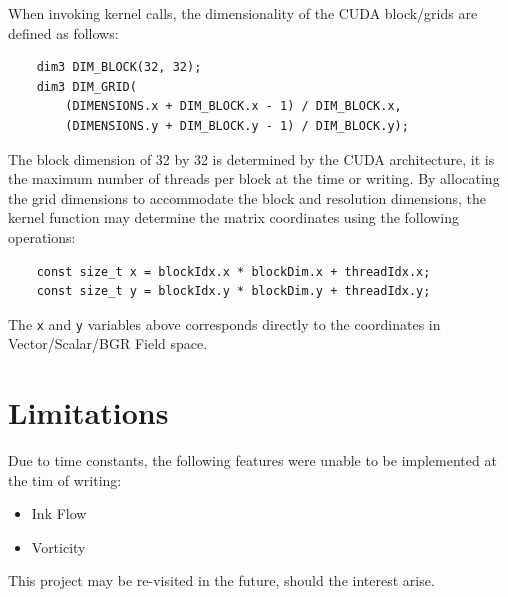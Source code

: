 \documentclass[
10pt, %
letterpaper, %
oneside, %
headinclude,footinclude, %
BCOR5mm, %
]{scrartcl}
\begin{document}
When invoking kernel calls, the dimensionality of the CUDA block/grids are defined as follows:
\begin{verbatim}
    dim3 DIM_BLOCK(32, 32);
    dim3 DIM_GRID(
        (DIMENSIONS.x + DIM_BLOCK.x - 1) / DIM_BLOCK.x,
        (DIMENSIONS.y + DIM_BLOCK.y - 1) / DIM_BLOCK.y);
\end{verbatim}

The block dimension of 32 by 32 is determined by the CUDA architecture, it is the maximum number of threads per block at the time or writing.
By allocating the grid dimensions to accommodate the block and resolution dimensions, the kernel function may determine the matrix coordinates
using the following operations:

\begin{verbatim}
    const size_t x = blockIdx.x * blockDim.x + threadIdx.x;
    const size_t y = blockIdx.y * blockDim.y + threadIdx.y;
\end{verbatim}

The \verb|x| and \verb|y| variables above corresponds directly to the coordinates in Vector/Scalar/BGR Field space.

\section{Limitations} %
Due to time constants, the following features were unable to be implemented at the tim of writing:
\begin{itemize}
    \item Ink Flow
    \item Vorticity
\end{itemize}

This project may be re-visited in the future, should the interest arise.
\end{document}
